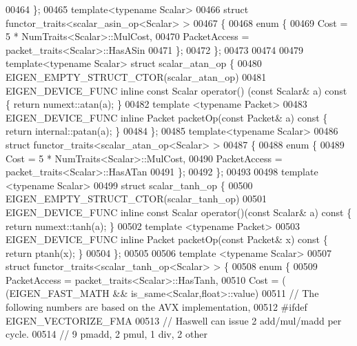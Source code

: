 \begin{DoxyCode}
00464 \};
00465 \textcolor{keyword}{template}<\textcolor{keyword}{typename} Scalar>
00466 \textcolor{keyword}{struct }functor\_traits<scalar\_asin\_op<Scalar> >
00467 \{
00468   \textcolor{keyword}{enum} \{
00469     Cost = 5 * NumTraits<Scalar>::MulCost,
00470     PacketAccess = packet\_traits<Scalar>::HasASin
00471   \};
00472 \};
00473 
00474 
00479 \textcolor{keyword}{template}<\textcolor{keyword}{typename} Scalar> \textcolor{keyword}{struct }scalar\_atan\_op \{
00480   EIGEN\_EMPTY\_STRUCT\_CTOR(scalar\_atan\_op)
00481   EIGEN\_DEVICE\_FUNC \textcolor{keyword}{inline} \textcolor{keyword}{const} Scalar operator() (\textcolor{keyword}{const} Scalar& a)\textcolor{keyword}{ const }\{ \textcolor{keywordflow}{return} numext::atan(a); \}
00482   \textcolor{keyword}{template} <\textcolor{keyword}{typename} Packet>
00483   EIGEN\_DEVICE\_FUNC \textcolor{keyword}{inline} Packet packetOp(\textcolor{keyword}{const} Packet& a)\textcolor{keyword}{ const }\{ \textcolor{keywordflow}{return} internal::patan(a); \}
00484 \};
00485 \textcolor{keyword}{template}<\textcolor{keyword}{typename} Scalar>
00486 \textcolor{keyword}{struct }functor\_traits<scalar\_atan\_op<Scalar> >
00487 \{
00488   \textcolor{keyword}{enum} \{
00489     Cost = 5 * NumTraits<Scalar>::MulCost,
00490     PacketAccess = packet\_traits<Scalar>::HasATan
00491   \};
00492 \};
00493 
00498 \textcolor{keyword}{template} <\textcolor{keyword}{typename} Scalar>
00499 \textcolor{keyword}{struct }scalar\_tanh\_op \{
00500   EIGEN\_EMPTY\_STRUCT\_CTOR(scalar\_tanh\_op)
00501   EIGEN\_DEVICE\_FUNC \textcolor{keyword}{inline} \textcolor{keyword}{const} Scalar operator()(\textcolor{keyword}{const} Scalar& a)\textcolor{keyword}{ const }\{ \textcolor{keywordflow}{return} numext::tanh(a); \}
00502   \textcolor{keyword}{template} <\textcolor{keyword}{typename} Packet>
00503   EIGEN\_DEVICE\_FUNC \textcolor{keyword}{inline} Packet packetOp(\textcolor{keyword}{const} Packet& x)\textcolor{keyword}{ const }\{ \textcolor{keywordflow}{return} ptanh(x); \}
00504 \};
00505 
00506 \textcolor{keyword}{template} <\textcolor{keyword}{typename} Scalar>
00507 \textcolor{keyword}{struct }functor\_traits<scalar\_tanh\_op<Scalar> > \{
00508   \textcolor{keyword}{enum} \{
00509     PacketAccess = packet\_traits<Scalar>::HasTanh,
00510     Cost = ( (EIGEN\_FAST\_MATH && is\_same<Scalar,float>::value)
00511 \textcolor{comment}{// The following numbers are based on the AVX implementation,}
00512 #ifdef EIGEN\_VECTORIZE\_FMA
00513                 \textcolor{comment}{// Haswell can issue 2 add/mul/madd per cycle.}
00514                 \textcolor{comment}{// 9 pmadd, 2 pmul, 1 div, 2 other}

\end{DoxyCode}

